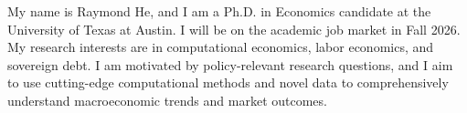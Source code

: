 \documentclass[11pt, a4paper]{article}
\title{\Large{\sc{\textbf{Solving the Full Model with GPR}}}}
\author{}
\date{\today}
\begin{document}
My name is Raymond He, and I am a Ph.D. in Economics candidate at the University of Texas at 
Austin. I will be on the academic job market in Fall 2026. My research interests are in 
computational economics, labor economics, and sovereign debt. I am motivated by policy-relevant 
research questions, and I aim to use cutting-edge computational methods and novel data to 
comprehensively understand macroeconomic trends and market outcomes.
\end{document}
